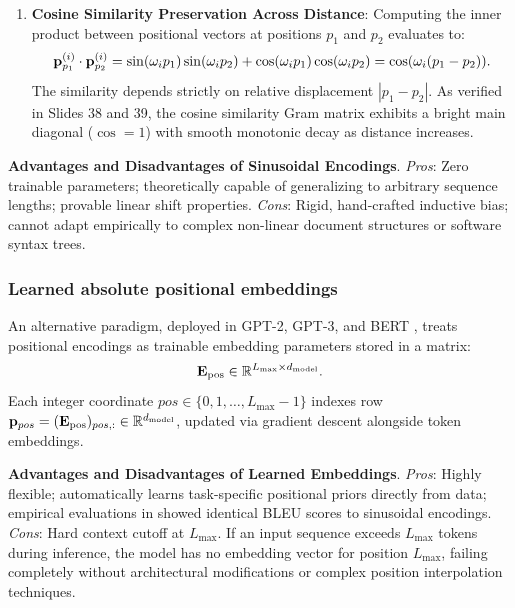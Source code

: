 \documentclass[../../main.tex]{subfiles}
\begin{document}
\begin{enumerate}
\begin{proof}
    \end{proof}
    \item \textbf{Cosine Similarity Preservation Across Distance}: Computing the inner product between positional vectors at positions $p_1$ and $p_2$ evaluates to:
    \begin{equation}
    \mathbf{p}_{p_1}^{(i)} \cdot \mathbf{p}_{p_2}^{(i)} = \sin(\omega_i p_1)\sin(\omega_i p_2) + \cos(\omega_i p_1)\cos(\omega_i p_2) = \cos(\omega_i (p_1 - p_2)).
    \end{equation}
    The similarity depends strictly on relative displacement $|p_1 - p_2|$. As verified in Slides 38 and 39, the cosine similarity Gram matrix exhibits a bright main diagonal ($\cos = 1$) with smooth monotonic decay as distance increases.
\end{enumerate}

\noindent\textbf{Advantages and Disadvantages of Sinusoidal Encodings}.\newline
\emph{Pros}: Zero trainable parameters; theoretically capable of generalizing to arbitrary sequence lengths; provable linear shift properties.\newline
\emph{Cons}: Rigid, hand-crafted inductive bias; cannot adapt empirically to complex non-linear document structures or software syntax trees.

\subsubsection{Learned absolute positional embeddings}
An alternative paradigm, deployed in GPT-2, GPT-3, and BERT \cite{radford2019, brown2020, devlin2019}, treats positional encodings as trainable embedding parameters stored in a matrix:
\begin{equation}
\label{eq:learned_pos_embeddings}
\mathbf{E}_{\text{pos}} \in \mathbb{R}^{L_{\max} \times d_{\text{model}}}.
\end{equation}
Each integer coordinate $pos \in \{0, 1, \dots, L_{\max}-1\}$ indexes row $\mathbf{p}_{pos} = (\mathbf{E}_{\text{pos}})_{pos, :} \in \mathbb{R}^{d_{\text{model}}}$, updated via gradient descent alongside token embeddings.

\noindent\textbf{Advantages and Disadvantages of Learned Embeddings}.\newline
\emph{Pros}: Highly flexible; automatically learns task-specific positional priors directly from data; empirical evaluations in \cite{vaswani2017} showed identical BLEU scores to sinusoidal encodings.\newline
\emph{Cons}: Hard context cutoff at $L_{\max}$. If an input sequence exceeds $L_{\max}$ tokens during inference, the model has no embedding vector for position $L_{\max}$, failing completely without architectural modifications or complex position interpolation techniques.
\end{document}
